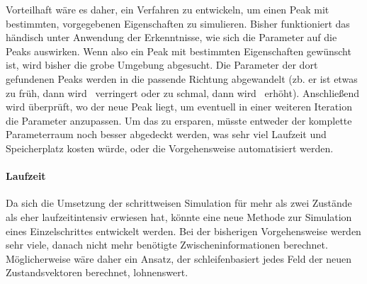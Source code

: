 Vorteilhaft wäre es daher, ein Verfahren zu entwickeln, um einen Peak mit bestimmten, vorgegebenen Eigenschaften zu simulieren. Bisher funktioniert das händisch unter Anwendung der Erkenntnisse, wie sich die Parameter auf die Peaks auswirken. Wenn also ein Peak mit bestimmten Eigenschaften gewünscht ist, wird bisher die grobe Umgebung abgesucht. Die Parameter der dort gefundenen Peaks werden in die passende Richtung abgewandelt (zb. er ist etwas zu früh, dann wird \pmm\ verringert oder zu schmal, dann wird \pll\ erhöht). Anschließend wird überprüft, wo der neue Peak liegt, um eventuell in einer weiteren Iteration die Parameter anzupassen. 
Um das zu ersparen, müsste entweder der komplette Parameterraum noch besser abgedeckt werden, was sehr viel Laufzeit und Speicherplatz kosten würde, oder die Vorgehensweise automatisiert werden.

\paragraph{Laufzeit}

Da sich die Umsetzung der schrittweisen Simulation für mehr als zwei Zustände als eher laufzeitintensiv erwiesen hat, könnte eine neue Methode zur Simulation eines Einzelschrittes entwickelt werden. Bei der bisherigen Vorgehensweise werden sehr viele, danach nicht mehr benötigte Zwischeninformationen berechnet. Möglicherweise wäre daher ein Ansatz, der schleifenbasiert jedes Feld der neuen Zustandsvektoren berechnet, lohnenswert.

